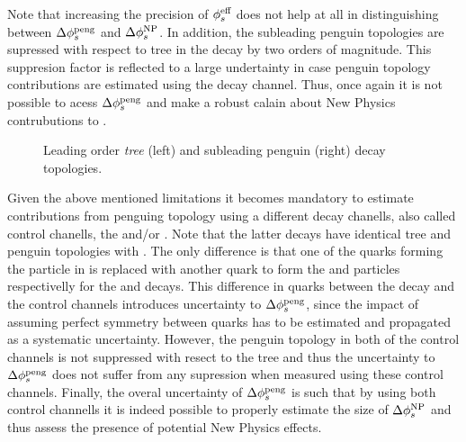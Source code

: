 \noindent Note that increasing the precision of $\phi_{s}^{\text {eff}}$ does not help at all in distinguishing
between $\Delta\phi_{s}^{\tiny\text{peng}}$ and $\Delta\phi_{s}^{\tiny \text{NP}}$. In addition, the subleading penguin
topologies are supressed with respect to tree in the \BsJpsiPhi decay by two orders of magnitude.
This suppresion factor is reflected to a large undertainty in case penguin topology contributions
are estimated using the \BsJpsiPhi decay channel. Thus, once again it is not possible to
acess $\Delta\phi_{s}^{\tiny\text{peng}}$ and make a robust calain about New Physics contrubutions to \phis.

\begin{figure}[t]
  \begin{subfigure}{0.5\textwidth}
    \raggedright
    {\scalebox{1}{\sffamily }}
    \label{app_jpsiphi_tree}
  \end{subfigure}%
  \hfill
  \begin{subfigure}{0.5\textwidth}
    \raggedleft
    {\scalebox{1}{\sffamily }}
    \label{app_jpsiphi_peng}
  \end{subfigure}
    \caption{Leading order {\it tree} (left) and subleading penguin (right) \BsJpsiPhi decay topologies.}
  \label{app_jpsiphi_tree_peng}
\end{figure}

Given the above mentioned limitations it becomes mandatory to estimate contributions from
penguing topology using a different decay chanells, also called control chanells,
\eg the \BsJpsiKst and/or \BdJpsiRho. Note that the latter decays have identical tree and penguin
topologies with \BsJpsiPhi. The only difference is that one of the quarks forming the \Pphi
particle in  is replaced with another quark to form the \Kstarz
and \rhoz particles respectivelly for the \BsJpsiKst and \BdJpsiRho decays. This difference in
quarks between the \BsJpsiPhi decay and the control channels introduces uncertainty to
$\Delta\phi_{s}^{\tiny\text{peng}}$, since the impact of assuming perfect symmetry between quarks has to be
estimated and propagated as a systematic uncertainty. However, the penguin topology in both of
the control channels is not suppressed with resect to the tree and thus the uncertainty to
$\Delta\phi_{s}^{\tiny\text{peng}}$ does not suffer from any supression when measured using these control
channels. Finally, the overal uncertainty of $\Delta\phi_{s}^{\tiny\text{peng}}$ is such
that by using both control channells it is indeed possible to properly estimate the size of
$\Delta\phi_{s}^{\tiny \text{NP}}$ and thus assess the presence of potential New Physics effects.

